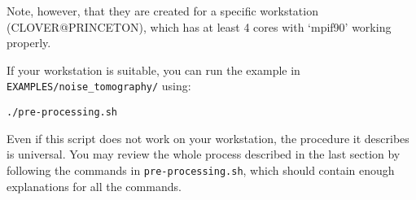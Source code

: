 Note, however, that they are created for a specific workstation (CLOVER@PRINCETON),
which has at least 4 cores with `mpif90' working properly. \newline


If your workstation is suitable, you can run the example in \texttt{EXAMPLES/noise\_tomography/}
using:\newline

\texttt{./pre-processing.sh}\newline


Even if this script does not work on your workstation, the procedure
it describes is universal. You may review the whole process described
in the last section by following the commands in \texttt{pre-processing.sh},
which should contain enough explanations for all the commands.

